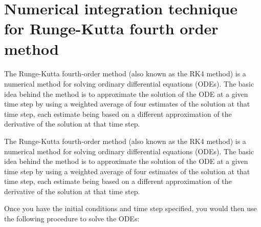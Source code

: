 \section{ Numerical integration technique for Runge-Kutta fourth order method}
\paragraph{}

The Runge-Kutta fourth-order method (also known as the RK4 method) is a numerical method for solving ordinary differential equations (ODEs). The basic idea behind the method is to approximate the solution of the ODE at a given time step by using a weighted average of four estimates of the solution at that time step, each estimate being based on a different approximation of the derivative of the solution at that time step.

The Runge-Kutta fourth-order method (also known as the RK4 method) is a numerical method for solving ordinary differential equations (ODEs). The basic idea behind the method is to approximate the solution of the ODE at a given time step by using a weighted average of four estimates of the solution at that time step, each estimate being based on a different approximation of the derivative of the solution at that time step.

Once you have the initial conditions and time step specified, you would then use the following procedure to solve the ODEs:

